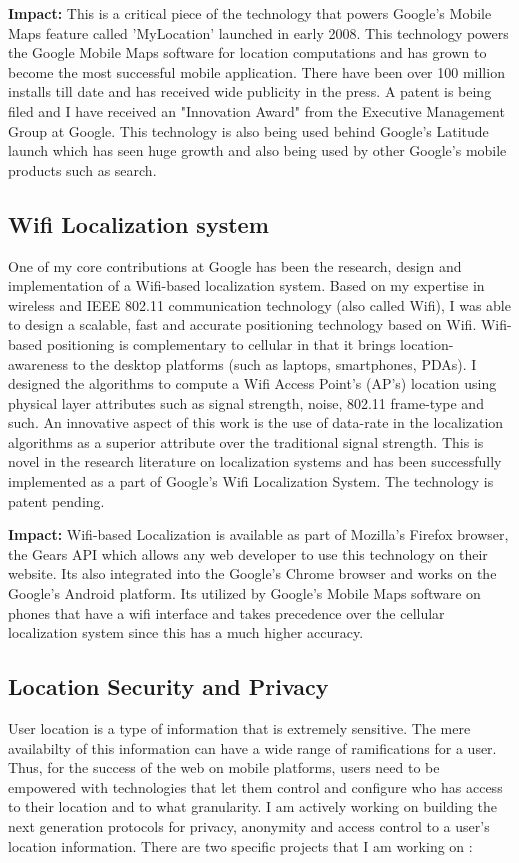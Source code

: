 \documentclass[11pt,letterpaper]{article}
\begin{document}
{\bf Impact:} This is a critical piece of the technology that powers Google's Mobile Maps feature called 'MyLocation' launched in early
2008. This technology powers the Google Mobile Maps software for location computations and has grown to become the most successful
mobile application. There have been over 100 million installs till date and has received wide publicity in the press.
A patent is being filed and I have received an "Innovation Award" from the Executive Management Group at
Google. This technology is also being used behind Google's Latitude launch which has seen huge growth and also being
used by other Google's mobile products such as search.

\subsection*{Wifi Localization system} One of my core contributions at Google has been the research, design and
implementation of a Wifi-based localization system. Based on my expertise in wireless and IEEE 802.11 communication
technology (also called Wifi), I was able to design a scalable, fast and accurate positioning technology based on Wifi.
Wifi-based positioning is complementary to cellular in that it brings location-awareness to the desktop platforms (such
as laptops, smartphones, PDAs). I designed the algorithms to compute a Wifi Access Point's (AP's) location using
physical layer attributes such as signal strength, noise, 802.11 frame-type and such.  An innovative aspect of this work
is the use of data-rate in the localization algorithms as a superior attribute over the traditional signal strength.
This is novel in the research literature on localization systems and has been successfully implemented as a part of
Google's Wifi Localization System. The technology is patent pending.

{\bf Impact:} Wifi-based Localization is available as part of Mozilla's Firefox browser, the Gears API which allows any
web developer to use this technology on their website. Its also integrated into the Google's Chrome browser and works
on the Google's Android platform. Its utilized by Google's Mobile Maps software on phones that have a wifi interface
and takes precedence over the cellular localization system since this has a much higher accuracy.

\subsection*{Location Security and Privacy}
User location is a type of information that is extremely sensitive. The mere availabilty of this information can have
a wide range of ramifications for a user. Thus, for the success of the web on mobile platforms, users need to be
empowered with technologies that let them control and configure who has access to their location and to what granularity.
I am actively working on building the next generation protocols for privacy, anonymity and access control
to a user's location information. There are two specific projects that I am working on :
\end{document}
